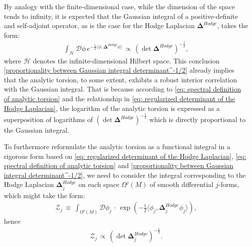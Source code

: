 By analogy with the finite-dimensional case, while the dimension of the space tends to infinity, it is expected that the Gaussian integral of a positive-definite and self-adjoint operator, as is the case for the Hodge Laplacian $\mathbf{\Delta}^{Hodge}$, takes the form:
\begin{equation}\label{proportionality between Gaussian integral determinant^-1/2}
    \begin{split}
        \int_{\mathscr{H}} \mathcal{D}\phi\,e^{-\frac{1}{2}\langle\phi,\mathbf{\Delta}^{Hodge}\phi\rangle}\,\propto\,\left(\det\mathbf{\Delta}^{Hodge}\right)^{-\frac{1}{2}},
    \end{split}
\end{equation}
where $\mathscr{H}$ denotes the infinite-dimensional Hilbert space. This conclusion \eqref{proportionality between Gaussian integral determinant^-1/2} already implies that the analytic torsion, to some extent, exhibits a robust interior correlation with the Gaussian integral. That is because according to \eqref{eq: spectral definition of analytic torsion} and the relationship in \eqref{eq: regularized determinant of the Hodge Laplacian}, the logarithm of the analytic torsion is expressed as a superposition of logarithms of $\left(\det\mathbf{\Delta}^{Hodge}\right)^{-\frac{1}{2}}$ which is directly proportional to the Gaussian integral. 
\par To furthermore reformulate the analytic torsion as a functional integral in a rigorous form based on \eqref{eq: regularized determinant of the Hodge Laplacian}, \eqref{eq: spectral definition of analytic torsion} and \eqref{proportionality between Gaussian integral determinant^-1/2}, we need to consider the integral corresponding to the Hodge Laplacian $\mathbf{\Delta}^{Hodge}_{j}$ on each space $\Omega^{j}\left(M\right)$ of smooth differential $j$-forms, which might take the form:
\begin{equation}
    \begin{split}
        \mathcal{Z}_{j}\,\equiv\,\int_{\Omega^{j}\left(M\right)}\mathcal{D}\phi_{j}\,\cdot\,\exp\left(-\frac{1}{2}\langle\phi_{j},\mathbf{\Delta}^{Hodge}_{j}\phi_{j}\rangle\right),
    \end{split}
\end{equation}
hence
\begin{equation}
    \begin{split}
        \mathcal{Z}_{j}\,\propto\,\left(\det\mathbf{\Delta}^{Hodge}_{j}\right)^{-\frac{1}{2}}.
    \end{split}
\end{equation}
